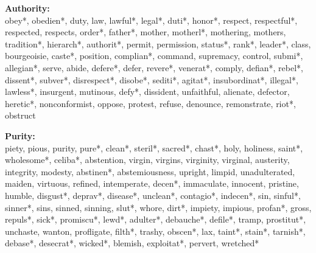 \documentclass[12pt]{article}
\begin{document}
\begin{flushleft}
\textbf{Authority:}\\
obey*, obedien*, duty, law, lawful*, legal*, duti*, honor*, respect, respectful*, respected, respects, order*, father*, mother, motherl*, mothering, mothers, tradition*, hierarch*, authorit*, permit, permission, status*, rank*, leader*, class, bourgeoisie, caste*, position, complian*, command, supremacy, control, submi*, allegian*, serve, abide, defere*, defer, revere*, venerat*, comply, defian*, rebel*, dissent*, subver*, disrespect*, disobe*, sediti*, agitat*, insubordinat*, illegal*, lawless*, insurgent, mutinous, defy*, dissident, unfaithful, alienate, defector, heretic*, nonconformist, oppose, protest, refuse, denounce, remonstrate, riot*, obstruct
\vspace{.5cm}

\textbf{Purity:}\\
piety, pious, purity, pure*, clean*, steril*, sacred*, chast*, holy, holiness, saint*, wholesome*, celiba*, abstention, virgin, virgins, virginity, virginal, austerity, integrity, modesty, abstinen*, abstemiousness, upright, limpid, unadulterated, maiden, virtuous, refined, intemperate, decen*, immaculate, innocent, pristine, humble, disgust*, deprav*, disease*, unclean*, contagio*, indecen*, sin, sinful*, sinner*, sins, sinned, sinning, slut*, whore, dirt*, impiety, impious, profan*, gross, repuls*, sick*, promiscu*, lewd*, adulter*, debauche*, defile*, tramp, prostitut*, unchaste, wanton, profligate, filth*, trashy, obscen*, lax, taint*, stain*, tarnish*, debase*, desecrat*, wicked*, blemish, exploitat*, pervert, wretched*
\vspace{.5cm}


\end{flushleft}

\renewcommand\thefigure{\thesection.\arabic{figure}}
\renewcommand\thetable{\thesection.\arabic{table}}
\setcounter{figure}{0}
\setcounter{table}{0}
\end{document}
